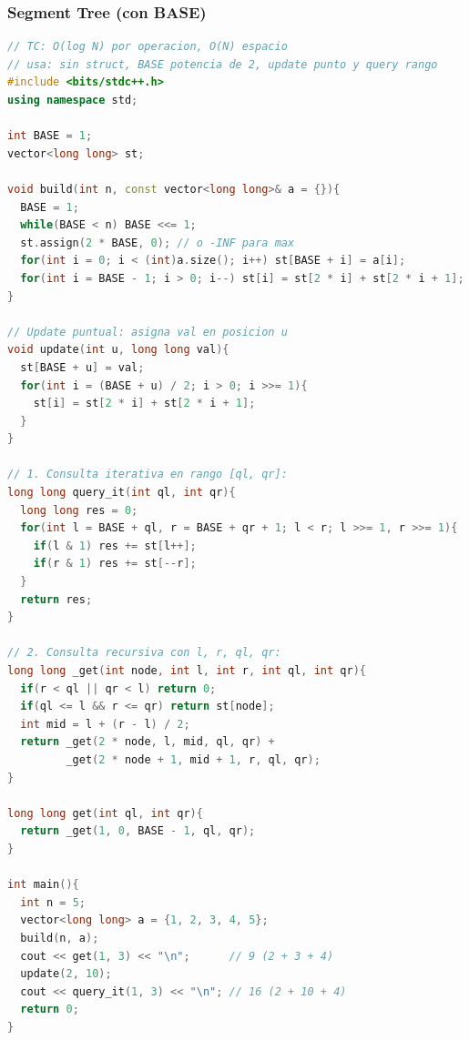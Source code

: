 \subsubsection{Segment Tree (con BASE)}
\begin{lstlisting}[style=mystyle, language=C++]
// TC: O(log N) por operacion, O(N) espacio
// usa: sin struct, BASE potencia de 2, update punto y query rango
#include <bits/stdc++.h>
using namespace std;

int BASE = 1;
vector<long long> st;

void build(int n, const vector<long long>& a = {}){
  BASE = 1;
  while(BASE < n) BASE <<= 1;
  st.assign(2 * BASE, 0); // o -INF para max
  for(int i = 0; i < (int)a.size(); i++) st[BASE + i] = a[i];
  for(int i = BASE - 1; i > 0; i--) st[i] = st[2 * i] + st[2 * i + 1];
}

// Update puntual: asigna val en posicion u
void update(int u, long long val){
  st[BASE + u] = val;
  for(int i = (BASE + u) / 2; i > 0; i >>= 1){
    st[i] = st[2 * i] + st[2 * i + 1];
  }
}

// 1. Consulta iterativa en rango [ql, qr]:
long long query_it(int ql, int qr){
  long long res = 0;
  for(int l = BASE + ql, r = BASE + qr + 1; l < r; l >>= 1, r >>= 1){
    if(l & 1) res += st[l++];
    if(r & 1) res += st[--r];
  }
  return res;
}

// 2. Consulta recursiva con l, r, ql, qr:
long long _get(int node, int l, int r, int ql, int qr){
  if(r < ql || qr < l) return 0;
  if(ql <= l && r <= qr) return st[node];
  int mid = l + (r - l) / 2;
  return _get(2 * node, l, mid, ql, qr) + 
         _get(2 * node + 1, mid + 1, r, ql, qr);
}

long long get(int ql, int qr){
  return _get(1, 0, BASE - 1, ql, qr);
}

int main(){
  int n = 5;
  vector<long long> a = {1, 2, 3, 4, 5};
  build(n, a);
  cout << get(1, 3) << "\n";      // 9 (2 + 3 + 4)
  update(2, 10);
  cout << query_it(1, 3) << "\n"; // 16 (2 + 10 + 4)
  return 0;
}
\end{lstlisting}
